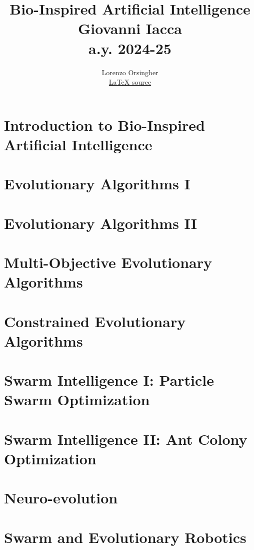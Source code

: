 \documentclass{report}
\title{\textbf{\Huge Bio-Inspired Artificial Intelligence} \\ \large Giovanni Iacca \\
\large a.y. 2024-25}
\author{Lorenzo Orsingher \\
\href{https://github.com/lorenzoorsingher/BIOAI_notes}{\LaTeX{} source}
}
\date{}  %
\begin{document}
\maketitle

\tableofcontents

\chapter{Introduction to Bio-Inspired Artificial Intelligence}


\chapter{Evolutionary Algorithms I}


\chapter{Evolutionary Algorithms II}


\chapter{Multi-Objective Evolutionary Algorithms}


\chapter{Constrained Evolutionary Algorithms}


\chapter{Swarm Intelligence I: Particle Swarm Optimization}


\chapter{Swarm Intelligence II: Ant Colony Optimization}


\chapter{Neuro-evolution}


\chapter{Swarm and Evolutionary Robotics}

\end{document}

